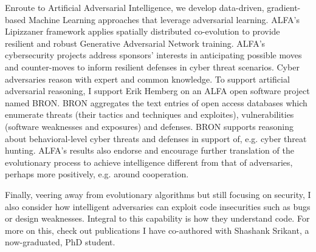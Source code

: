 \documentclass[12pt,bibliography=numbered]{article}
\begin{document}
Enroute to Artificial Adversarial Intelligence, we  develop data-driven, gradient-based Machine Learning approaches that leverage adversarial learning. ALFA's Lipizzaner framework applies spatially distributed co-evolution to provide resilient and robust Generative Adversarial Network training. ALFA's  cybersecurity projects address sponsors’ interests in anticipating possible moves and counter-moves to inform resilient defenses in cyber threat scenarios.  Cyber adversaries reason with expert and common knowledge. To support artificial adversarial reasoning, I support Erik Hemberg on an ALFA open software project named BRON. BRON  aggregates the text entries of open access databases which enumerate threats (their tactics and techniques and exploites), vulnerabilities (software weaknesses and exposures) and defenses. BRON supports reasoning about behavioral-level cyber threats and defenses in support of, e.g. cyber threat hunting. ALFA's results also endorse and encourage further translation of the evolutionary process to achieve intelligence different from that of adversaries, perhaps more positively, e.g. around cooperation.  

Finally, veering away from evolutionary algorithms but still focusing on security, I also consider how intelligent adversaries can exploit code insecurities such as bugs or design weaknesses. Integral to this capability is how they understand code.  For more on this, check out publications I have co-authored with Shashank Srikant, a now-graduated, PhD student.

\newpage


%


\end{document}
